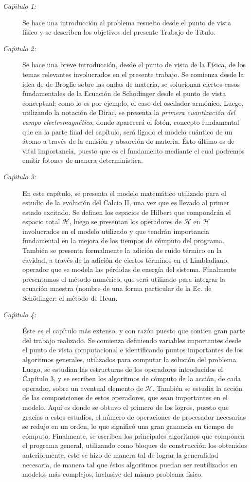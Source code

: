 \begin{description}
 \item [\emph{Ca\'pitulo 1:} ] Se hace una introducci\'on al problema resuelto desde el punto de vista f\'isico y se describen los objetivos del presente Trabajo de T\'itulo.
\item [\emph{Ca\'pitulo 2:} ] Se hace una breve introducci\'on, desde el punto de vista de la F\'isica, de los temas relevantes involucrados en el presente trabajo. Se comienza desde la idea de de Broglie sobre las ondas de materia, se solucionan ciertos casos fundamentales de la Ecuaci\'on de Sch\"odinger desde el punto de vista conceptual; como lo es por ejemplo, el caso del oscilador arm\'onico. Luego, utilizando la notaci\'on de Dirac, se presenta la \emph{primera cuantizaci\'on del campo electromagn\'etico}, donde aparecer\'a el fot\'on, concepto fundamental que en la parte final del cap\'itulo, ser\'a ligado el modelo cu\'antico de un \'atomo a trav\'es de la emisi\'on y absorci\'on de materia. \'Esto \'ultimo es de vital importancia, puesto que es el fundamento mediante el cual podremos emitir fotones de manera determin\'istica.
\item [\emph{Ca\'pitulo 3:} ] En este cap\'itulo, se presenta el modelo matem\'atico utilizado para el estudio de la evoluci\'on del Calcio II, una vez que es llevado al primer estado excitado. Se definen los espacios de Hilbert que compondr\'an el espacio total $\mathcal{H}$, luego se presentan los operadores de $\mathcal{H}$ en $\mathcal{H}$ involucrados en el modelo utilizado y que tendr\'an importancia fundamental en la mejora de los tiempos de c\'omputo del programa. Tambi\'en se presenta formalmente la adici\'on de ruido t\'ermico en la cavidad, a trav\'es de la adici\'on de ciertos t\'erminos en el Limbladiano, operador que se modela las p\'erdidas de energ\'ia del sistema. Finalmente presentamos el m\'etodo num\'erico, que ser\'a utilizado para integrar la ecuaci\'on maestra (nombre de una forma particular de la Ec. de Sch\"odinger: el m\'etodo de Heun.
\item [\emph{Ca\'pitulo 4:} ] \'Este es el cap\'itulo m\'as extenso, y con raz\'on puesto que contien gran parte del trabajo realizado. Se comienza definiendo variables importantes desde el punto de vista computacional e identificando puntos importantes de los algoritmos generales, utilizados para computar la soluci\'on del problema. Luego, se estudian las estructuras de los operadores introducidos el Cap\'itulo 3, y se escriben los algoritmos de c\'omputo de la acci\'on, de cada operador, sobre un eventual elemento de $\mathcal{H}$. Tambi\'en se estudia la acci\'on de las composiciones de estos operadores, que sean importantes en el modelo. Aqu\'i es donde se obtuvo el primero de los logros, puesto que gracias a estos estudios, el n\'umero de operaciones de procesador necesarias se redujo en un orden, lo que signific\'o una gran ganancia en tiempo de c\'omputo. Finalmente, se escriben los principales algoritmos que componen el programa general, utilizando como bloques de construcci\'on los obtenidos anteriormente, esto se hizo de manera tal de lograr la generalidad necesaria, de manera tal que \'estos algoritmos puedan ser reutilizados en modelos m\'as complejos, inclusive del mismo problema f\'isico.

\end{description}

